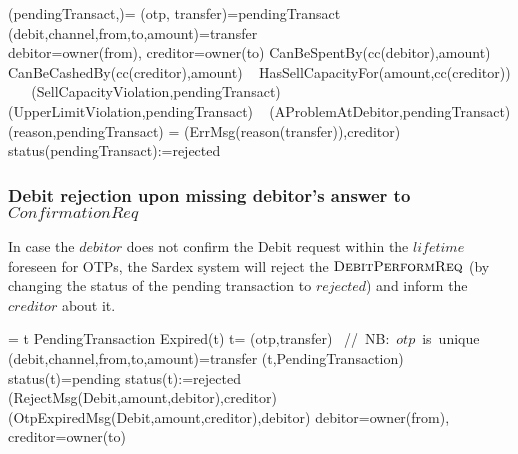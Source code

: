 \begin{asm}
(pendingTransact,)=\+
\LET (otp, transfer)=pendingTransact\\
 \LET (debit,channel,from,to,amount)=transfer\\
\LET debitor=owner(from), creditor=owner(to)\+
              \IF CanBeSpentBy(cc(debitor),amount) \+
                 \THEN ~ \IF CanBeCashedBy(cc(creditor),amount) \+
                    \THEN ~ \IF HasSellCapacityFor(amount,cc(creditor)) \+
                       \THEN ~  \-
                       \ELSE ~ 
                       (SellCapacityViolation,pendingTransact) \-
                 \ELSE ~ 
              (UpperLimitViolation,pendingTransact) \-
              \ELSE ~  
              (AProblemAtDebitor,pendingTransact) \dec\-
              \WHERE \+
              (reason,pendingTransact)  =\+
              (ErrMsg(reason(transfer)),\TO creditor)\\
              status(pendingTransact):=rejected 
\end{asm}


\subsubsection{Debit rejection upon missing debitor's answer to $ConfirmationReq$\\}
\label{sect:debitreject}
In case the $debitor$ does not confirm the Debit request within the $lifetime$ foreseen for OTPs, the Sardex system will reject the $\hbox{\sc DebitPerformReq}$ (by changing the status of the pending transaction to $rejected$) and inform the $creditor$ about it.
\begin{asm} 
 =\+          
\IF t \in PendingTransaction \AND Expired(t)  \THEN  \+
          \LET t= (otp,transfer) \mbox{ // NB: $otp$ is unique}\\
          \LET (debit,channel,from,to,amount)=transfer \+
(t,PendingTransaction) \\
          \IF status(t)=pending \THEN \+
          status(t):=rejected\\
(RejectMsg(Debit,amount,debitor),\TO creditor)\\ 
(OtpExpiredMsg(Debit,amount,creditor),\TO debitor)  \dec\dec\dec \-
          \WHERE debitor=owner(from), creditor=owner(to)
\end{asm}

